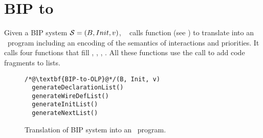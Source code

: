 \section{BIP to \caig}
\label{sec:bip2aig}
%
Given a BIP system $\mathcal{S} = (B, Init, v)$, \biptool~
calls function  (see ) to translate \Pm into 
an \caig~program including an encoding of the semantics of interactions and priorities. 
It calls four functions that fill , , , . 
All these functions use the  call to add code fragments to lists. 
%
\begin{figure}
\begin{lstlisting}
/*@\textbf{BIP-to-OLP}@*/(B, Init, v)
  generateDeclarationList()
  generateWireDefList()
  generateInitList()
  generateNextList()
\end{lstlisting}
\caption{Translation of BIP system into an \caig~program.}
\label{fig:bip-to-abc-function}
\end{figure}
%

